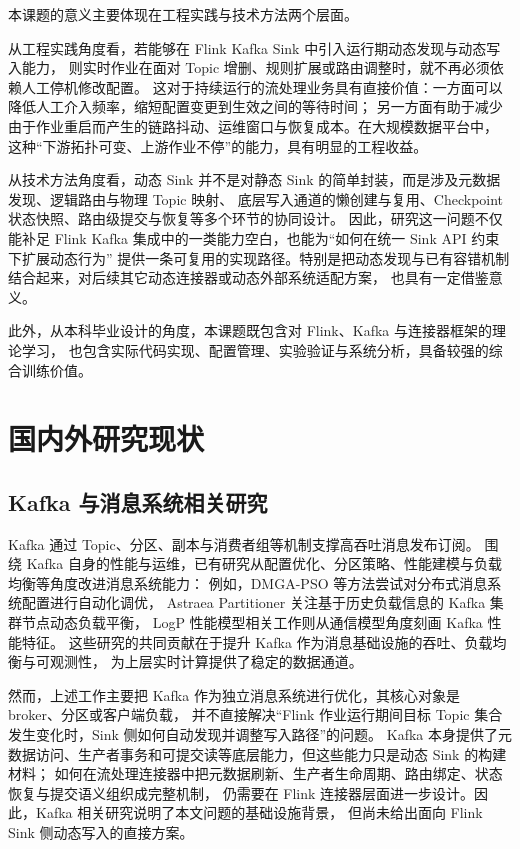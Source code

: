 本课题的意义主要体现在工程实践与技术方法两个层面。

从工程实践角度看，若能够在 Flink Kafka Sink 中引入运行期动态发现与动态写入能力，
则实时作业在面对 Topic 增删、规则扩展或路由调整时，就不再必须依赖人工停机修改配置。
这对于持续运行的流处理业务具有直接价值：一方面可以降低人工介入频率，缩短配置变更到生效之间的等待时间；
另一方面有助于减少由于作业重启而产生的链路抖动、运维窗口与恢复成本。在大规模数据平台中，
这种“下游拓扑可变、上游作业不停”的能力，具有明显的工程收益。

从技术方法角度看，动态 Sink 并不是对静态 Sink 的简单封装，而是涉及元数据发现、逻辑路由与物理 Topic 映射、
底层写入通道的懒创建与复用、Checkpoint 状态快照、路由级提交与恢复等多个环节的协同设计。
因此，研究这一问题不仅能补足 Flink Kafka 集成中的一类能力空白，也能为“如何在统一 Sink API 约束下扩展动态行为”
提供一条可复用的实现路径。特别是把动态发现与已有容错机制结合起来，对后续其它动态连接器或动态外部系统适配方案，
也具有一定借鉴意义。

此外，从本科毕业设计的角度，本课题既包含对 Flink、Kafka 与连接器框架的理论学习，
也包含实际代码实现、配置管理、实验验证与系统分析，具备较强的综合训练价值。

\section{国内外研究现状}

\subsection{Kafka 与消息系统相关研究}

Kafka 通过 Topic、分区、副本与消费者组等机制支撑高吞吐消息发布订阅\cite{kreps2011kafka}。
围绕 Kafka 自身的性能与运维，已有研究从配置优化、分区策略、性能建模与负载均衡等角度改进消息系统能力：
例如，DMGA-PSO 等方法尝试对分布式消息系统配置进行自动化调优\cite{ma2025dmga}，
Astraea Partitioner 关注基于历史负载信息的 Kafka 集群节点动态负载平衡\cite{wang2022astraea}，
LogP 性能模型相关工作则从通信模型角度刻画 Kafka 性能特征\cite{wu2021logp}。
这些研究的共同贡献在于提升 Kafka 作为消息基础设施的吞吐、负载均衡与可观测性，
为上层实时计算提供了稳定的数据通道。

然而，上述工作主要把 Kafka 作为独立消息系统进行优化，其核心对象是 broker、分区或客户端负载，
并不直接解决“Flink 作业运行期间目标 Topic 集合发生变化时，Sink 侧如何自动发现并调整写入路径”的问题。
Kafka 本身提供了元数据访问、生产者事务和可提交读等底层能力，但这些能力只是动态 Sink 的构建材料；
如何在流处理连接器中把元数据刷新、生产者生命周期、路由绑定、状态恢复与提交语义组织成完整机制，
仍需要在 Flink 连接器层面进一步设计。因此，Kafka 相关研究说明了本文问题的基础设施背景，
但尚未给出面向 Flink Sink 侧动态写入的直接方案。

